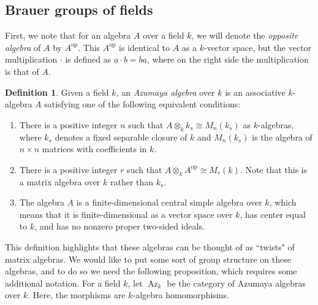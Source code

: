 \documentclass[12pt,twoside]{reedthesis}
\theoremstyle{plain}
\theoremstyle{definition}
\newtheorem{definition}{Definition}[section]
\theoremstyle{remark}
\newcommand{\Az}{\operatorname{Az}}
\newcommand{\op}{^{\text{op}}}
\begin{document}
\subsection{Brauer groups of fields}
First, we note that for an algebra $A$ over a field $k$, we will denote the \emph{opposite algebra} of $A$ by $A\op$. This $A\op$ is identical to $A$ as a $k$-vector space, but the vector multiplication $\cdot$ is defined as $a\cdot b=ba$, where on the right side the multiplication is that of $A$.
\begin{definition}
Given a field $k$, an \emph{Azumaya algebra} over $k$ is an associative $k$-algebra $A$ satisfying one of the following equivalent conditions:
\begin{enumerate}
\item There is a positive integer $n$ such that $A\otimes_k k_s\cong M_n(k_s)$ as $k$-algebras, where $k_s$ denotes a fixed separable closure of $k$ and $M_n(k_s)$ is the algebra of $n\times n$ matrices with coefficients in $k$.
\item There is a positive integer $r$ such that $A\otimes_k A\op\cong M_r(k)$. Note that this is a matrix algebra over $k$ rather than $k_s$.
\item The algebra $A$ is a finite-dimensional central simple algebra over $k$, which means that it is finite-dimensional as a vector space over $k$, has center equal to $k$, and has no nonzero proper two-sided ideals.
\end{enumerate}
\end{definition}
\noindent This definition highlights that these algebras can be thought of as ``twists" of matrix algebras.
We would like to put some sort of group structure on these algebras, and to do so we need the following proposition, which requires some additional notation. For a field $k$, let $\Az_k$ be the category of Azumaya algebras over $k$. Here, the morphisms are $k$-algebra homomorphisms.
\end{document}
